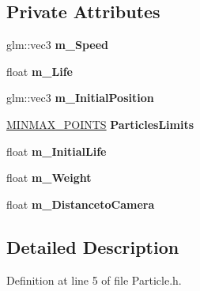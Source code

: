 \subsection*{Private Attributes}
\begin{DoxyCompactItemize}
\item 
glm\+::vec3 {\bfseries m\+\_\+\+Speed}\hypertarget{class_particle_a86b6e9e7c9c9de42db12236facbabeca}{}\label{class_particle_a86b6e9e7c9c9de42db12236facbabeca}

\item 
float {\bfseries m\+\_\+\+Life}\hypertarget{class_particle_aea24eafdc2b5076c934633df0e5d66d8}{}\label{class_particle_aea24eafdc2b5076c934633df0e5d66d8}

\item 
glm\+::vec3 {\bfseries m\+\_\+\+Initial\+Position}\hypertarget{class_particle_a36f770b833f1d72cbda09df2ac82edf9}{}\label{class_particle_a36f770b833f1d72cbda09df2ac82edf9}

\item 
\hyperlink{struct_m_i_n_m_a_x___p_o_i_n_t_s}{M\+I\+N\+M\+A\+X\+\_\+\+P\+O\+I\+N\+TS} {\bfseries Particles\+Limits}\hypertarget{class_particle_a8ff64075a331929bb7bbfc14cf144589}{}\label{class_particle_a8ff64075a331929bb7bbfc14cf144589}

\item 
float {\bfseries m\+\_\+\+Initial\+Life}\hypertarget{class_particle_a7f45803a20d8cef1f87081ba1d5d7066}{}\label{class_particle_a7f45803a20d8cef1f87081ba1d5d7066}

\item 
float {\bfseries m\+\_\+\+Weight}\hypertarget{class_particle_aaad85b10d66d84b46061d90e42c99535}{}\label{class_particle_aaad85b10d66d84b46061d90e42c99535}

\item 
float {\bfseries m\+\_\+\+Distanceto\+Camera}\hypertarget{class_particle_acf9e5adc68e538c8d2c1f91786316de7}{}\label{class_particle_acf9e5adc68e538c8d2c1f91786316de7}

\end{DoxyCompactItemize}


\subsection{Detailed Description}


Definition at line 5 of file Particle.\+h.

